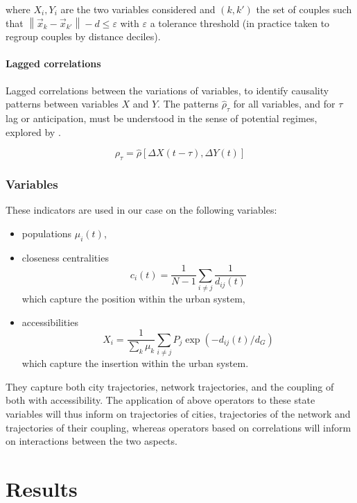 \documentclass[graybox]{svmult}
\newcommand{\norm}[1]{\left\lVert #1 \right\rVert}
\begin{document}
where $X_i, Y_i$ are the two variables considered and $(k,k')$ the set of couples such that $\norm{\vec{x}_k-\vec{x}_{k'}} - d \leq \varepsilon$ with $\varepsilon$ a tolerance threshold (in practice taken to regroup couples by distance deciles).


\paragraph{Lagged correlations}

Lagged correlations between the variations of variables, to identify causality patterns between variables $X$ and $Y$. The patterns $\hat{\rho}_{\tau}$ for all variables, and for $\tau$ lag or anticipation, must be understood in the sense of potential regimes, explored by \cite{raimbault2017identification}.

\begin{equation}
\rho_{\tau} = \hat{\rho}\left[\Delta X(t-\tau),\Delta Y(t)\right]
\end{equation}


\subsubsection{Variables}


These indicators are used in our case on the following variables:
\begin{itemize}
	\item populations $\mu_i(t)$,
	\item closeness centralities
	\[c_i(t) = \frac{1}{N-1}\sum_{i\neq j} \frac{1}{d_{ij}(t)}\]
	which capture the position within the urban system,
	\item accessibilities \[X_i = \frac{1}{\sum_k \mu_k}\sum_{i\neq j} P_j \exp{\left(- d_{ij}(t)/d_G\right)}\] which capture the insertion within the urban system.
\end{itemize}

They capture both city trajectories, network trajectories, and the coupling of both with accessibility. The application of above operators to these state variables will thus inform on trajectories of cities, trajectories of the network and trajectories of their coupling, whereas operators based on correlations will inform on interactions between the two aspects.



\section{Results}
\end{document}
